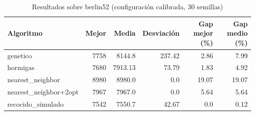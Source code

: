 \begin{table}[H]
\centering
\renewcommand{\arraystretch}{1.3}
\begin{tabular}{|l|r|r|r|r|r|}
\hline
Algoritmo & Mejor & Media & Desviación & Gap mejor (\%) & Gap medio (\%) \\
\hline
genetico & 7758 & 8144.8 & 237.42 & 2.86 & 7.99 \\
hormigas & 7680 & 7913.13 & 73.79 & 1.83 & 4.92 \\
nearest\_neighbor & 8980 & 8980.0 & 0.0 & 19.07 & 19.07 \\
nearest\_neighbor+2opt & 7967 & 7967.0 & 0.0 & 5.64 & 5.64 \\
recocido\_simulado & 7542 & 7550.7 & 42.67 & 0.0 & 0.12 \\
\hline
\end{tabular}
\caption{Resultados sobre berlin52 (configuración calibrada, 30 semillas)}
\label{tab:berlin52}
\end{table}